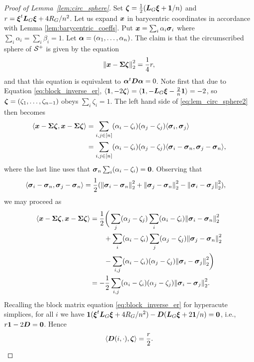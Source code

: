 \begin{proof}[Proof of Lemma~\ref{lem:circ_sphere}]
	Set $\vb*{\zeta} = \frac{1}{2}(\vb*{L}_G\vb*{\xi} + \vb{1}/n)$ and $r = \vb*{\xi}^t \vb*{L}_G\vb*{\xi}+4R_G/n^2$. 
	Let us expand $\vb*{x}$ in barycentric coordinates in accordance with Lemma \ref{lem:barycentric_coeffs}.  Put $\vb*{x}=\sum_i \alpha_i\vb*{\sigma}_i$ where $\sum_i\alpha_i=\sum_i\beta_i=1$. Let $\vb*{\alpha}=(\alpha_1,\dots,\alpha_n)$. 
	The claim is that the circumscribed sphere of $\mathcal{S}^+$ is given by the equation 
	\begin{equation}
	\label{eq:lem_circ_sphere2}
	\norm{\vb*{x} - \boldsymbol{\Sigma}\vb*{\zeta}}_2^2 = \frac{1}{4}r,
	\end{equation}
	and that this equation is equivalent to $\vb*{\alpha}^t \vb*{D}\vb*{\alpha}=0$. Note first that due to Equation \ref{eq:block_inverse_er}, $\langle \vb{1}, -2\vb*{\zeta}\rangle = \langle \vb{1}, -\vb*{L}_G\vb*{\xi} - \frac{2}{n}\vb{1}\rangle = -2$, so $\vb*{\zeta}=(\zeta_1,\dots,\zeta_{n-1})$ obeys $\sum_i \zeta_i=1$.  The left hand side of \eqref{eq:lem_circ_sphere2} then becomes 
	\begin{align*}
	\langle \vb*{x}-\boldsymbol{\Sigma}\vb*{\zeta},\vb*{x}-\boldsymbol{\Sigma}\vb*{\zeta}\rangle &= \sum_{i,j\in[n]} (\alpha_i-\zeta_i)(\alpha_j-\zeta_j) \langle \vb*{\sigma}_i,\vb*{\sigma}_j\rangle \\
	&= \sum_{i,j\in[n]} (\alpha_i-\zeta_i)(\alpha_j-\zeta_j) \langle \vb*{\sigma}_i-\vb*{\sigma}_n,\vb*{\sigma}_j-\vb*{\sigma}_n\rangle,
	\end{align*} 
	where the last line uses that $\vb*{\sigma}_n \sum_i(\alpha_i-\zeta_i)=\vb{0}$. 
	Observing that 
	\begin{align*}
	\langle \vb*{\sigma}_i-\vb*{\sigma}_n,\vb*{\sigma}_j-\vb*{\sigma}_n\rangle &= \frac{1}{2}(\norm{\vb*{\sigma}_i-\vb*{\sigma}_n}_2^2 + \norm{\vb*{\sigma}_j-\vb*{\sigma}_n}_2^2 - \norm{\vb*{\sigma}_i-\vb*{\sigma}_j}_2^2),
	\end{align*}
	we may proceed as
	\begin{align}
	\langle\vb*{x}-\boldsymbol{\Sigma}\vb*{\zeta},\vb*{x}-\boldsymbol{\Sigma}\vb*{\zeta}\rangle &= \frac{1}{2}\bigg(\sum_j (\alpha_j-\zeta_j) \sum_i (\alpha_i-\zeta_i)\norm{\vb*{\sigma}_i-\vb*{\sigma}_n}_2^2 \notag \\
	&\qquad + \sum_i (\alpha_i-\zeta_i) \sum_j (\alpha_j-\zeta_j)\norm{\vb*{\sigma}_j-\vb*{\sigma}_n}_2^2  \notag \\
	&\qquad - \sum_{i,j} (\alpha_i-\zeta_i)(\alpha_j-\zeta_j)\norm{\vb*{\sigma}_i-\vb*{\sigma}_j}_2^2 \bigg)\notag \\
	&= -\frac{1}{2}\sum_{i,j} (\alpha_i-\zeta_i)(\alpha_j-\zeta_j)\norm{\vb*{\sigma}_i-\vb*{\sigma}_j}_2^2. \label{eq:lem_circ_sphere}
	\end{align} 
	Recalling the block matrix equation \eqref{eq:block_inverse_er} for hyperacute simplices, for all $i$ we have $\vb{1} (\vb*{\xi}^t \vb*{L}_G\vb*{\xi} + 4R_G/n^2) - \vb*{D}(\vb*{L}_G\vb*{\xi} + 2\vb{1} /n) = \vb{0}$, i.e., $r\vb{1} -2\vb*{D} =\vb{0}$. Hence 
	\[\langle \vb*{D}(i,\cdot),\vb*{\zeta}\rangle = \frac{r}{2}.\]

\end{proof}
